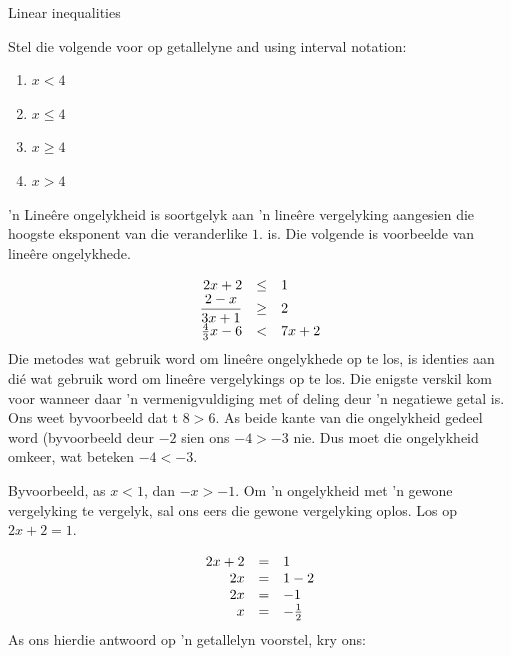 \begin{activity}{Linear inequalities}
{
Stel die volgende voor op getallelyne and using interval notation:
\begin{enumerate}[noitemsep, label=\textbf{\arabic*}. ] 
\item $x<4$
\item $x\leq 4$
\item $x\geq 4$
\item $x>4$
\end{enumerate}
}
\end{activity}

’n Lineêre ongelykheid is soortgelyk aan ’n lineêre vergelyking aangesien die hoogste eksponent van die veranderlike $1$. is. Die volgende is voorbeelde van lineêre ongelykhede.\par 

\begin{equation*}
\begin{array}{ccc}\hfill 2x+2& \leq& 1\hfill \\ \hfill \dfrac{2-x}{3x+1}&\geq& 2\hfill \\ \hfill \frac{4}{3}x-6&<& 7x+2\hfill \end{array}
\end{equation*}
Die metodes wat gebruik word om lineêre ongelykhede op te los, is identies aan dié wat gebruik word om
lineêre vergelykings op te los. Die enigste verskil kom voor wanneer daar ’n vermenigvuldiging met of deling
deur ’n negatiewe getal is. Ons weet byvoorbeeld dat
t $8>6$. As beide kante van die ongelykheid gedeel word (byvoorbeeld deur  $-2$ sien ons $-4 > -3$ nie. Dus moet die ongelykheid omkeer, wat beteken
$-4<-3$.


Byvoorbeeld, as  $x<1$, dan $-x>-1$.
Om ’n ongelykheid met ’n gewone vergelyking te vergelyk, sal ons eers die gewone vergelyking oplos. Los op $2x+2=1$.

\begin{equation*}
\begin{array}{ccl}\hfill 2x+2& =& 1\hfill \\ \hfill 2x& =& 1-2\hfill \\ \hfill 2x& =& -1\hfill \\ \hfill x& =& -\frac{1}{2}\hfill \end{array}
\end{equation*}
As ons hierdie antwoord op ’n getallelyn voorstel, kry ons:\par 

